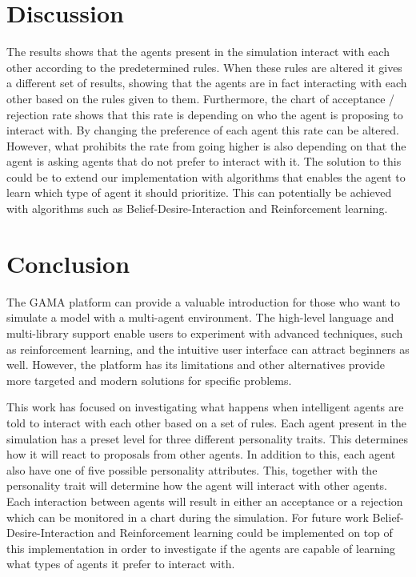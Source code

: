 \documentclass[a4paper,10pt]{article}
\begin{document}
\section{Discussion}
The results shows that the agents present in the simulation interact with each other according to the predetermined rules. When these rules are altered it gives a different set of results, showing that the agents are in fact interacting with each other based on the rules given to them. Furthermore, the chart of acceptance / rejection rate shows that this rate is depending on who the agent is proposing to interact with. By changing the preference of each agent this rate can be altered. However, what prohibits the rate from going higher is also depending on that the agent is asking agents that do not prefer to interact with it. The solution to this could be to extend our implementation with algorithms that enables the agent to learn which type of agent it should prioritize. This can potentially be achieved with algorithms such as Belief-Desire-Interaction and Reinforcement learning. 

\clearpage
\section{Conclusion}
The GAMA platform can provide a valuable introduction for those who want to simulate a model with a multi-agent environment. The high-level language and multi-library support enable users to experiment with advanced techniques, such as reinforcement learning, and the intuitive user interface can attract beginners as well. However, the platform has its limitations and other alternatives provide more targeted and modern solutions for specific problems. 

This work has focused on investigating what happens when intelligent agents are told to interact with each other based on a set of rules. Each agent present in the simulation has a preset level for three different personality traits. This determines how it will react to proposals from other agents. In addition to this, each agent also have one of five possible personality attributes. This, together with the personality trait will determine how the agent will interact with other agents. Each interaction between agents will result in either an acceptance or a rejection which can be monitored in a chart during the simulation. For future work Belief-Desire-Interaction and Reinforcement learning could be implemented on top of this implementation in order to investigate if the agents are capable of learning what types of agents it prefer to interact with. 
\end{document}
